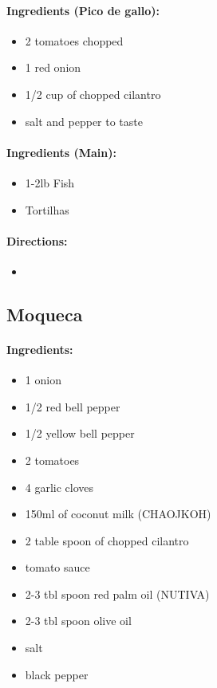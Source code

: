 \documentclass{article}
\begin{document}
\paragraph{Ingredients (Pico de gallo):}
\begin{itemize}
	\item 2 tomatoes chopped
	\item 1 red onion
	\item 1/2 cup of chopped cilantro
	\item salt and pepper to taste
\end{itemize}

\paragraph{Ingredients (Main):}
\begin{itemize}
	\item 1-2lb Fish
	\item Tortilhas
\end{itemize}

\paragraph{Directions:}
\begin{itemize}
	\item
\end{itemize}

\subsection{Moqueca}

\paragraph{Ingredients:}

\begin{itemize}
	\item 1 onion	
	\item 1/2 red bell pepper 
	\item 1/2 yellow bell pepper 
	\item 2 tomatoes
	\item 4 garlic cloves
	\item 150ml of coconut milk (CHAOJKOH)
	\item 2 table spoon of chopped cilantro
	\item tomato sauce
	\item 2-3 tbl spoon red palm oil (NUTIVA)
	\item 2-3 tbl spoon olive oil
	\item salt
	\item black pepper
\end{itemize}
\end{document}
